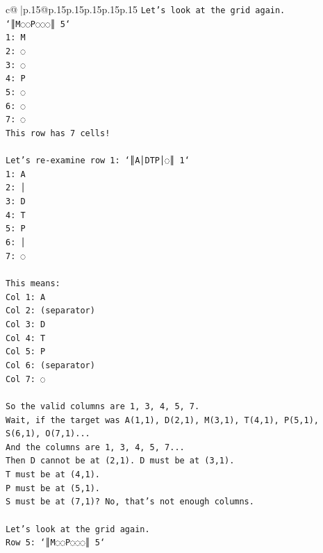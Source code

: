 \documentclass{article}
\begin{document}
{\begin{supertabular}{c@{$\;$}|p{.15\linewidth}@{}p{.15\linewidth}p{.15\linewidth}p{.15\linewidth}p{.15\linewidth}p{.15\linewidth}}
{{{\texttt{Let's look at the grid again.} \\
\texttt{`║M◌◌P◌◌◌║ 5`} \\
\texttt{1: M} \\
\texttt{2: ◌} \\
\texttt{3: ◌} \\
\texttt{4: P} \\
\texttt{5: ◌} \\
\texttt{6: ◌} \\
\texttt{7: ◌} \\
\texttt{This row has 7 cells!} \\
\\ 
\texttt{Let's re{-}examine row 1: `║A│DTP│◌║ 1`} \\
\texttt{1: A} \\
\texttt{2: │} \\
\texttt{3: D} \\
\texttt{4: T} \\
\texttt{5: P} \\
\texttt{6: │} \\
\texttt{7: ◌} \\
\\ 
\texttt{This means:} \\
\texttt{Col 1: A} \\
\texttt{Col 2: (separator)} \\
\texttt{Col 3: D} \\
\texttt{Col 4: T} \\
\texttt{Col 5: P} \\
\texttt{Col 6: (separator)} \\
\texttt{Col 7: ◌} \\
\\ 
\texttt{So the valid columns are 1, 3, 4, 5, 7.} \\
\texttt{Wait, if the target was A(1,1), D(2,1), M(3,1), T(4,1), P(5,1), S(6,1), O(7,1)...} \\
\texttt{And the columns are 1, 3, 4, 5, 7...} \\
\texttt{Then D cannot be at (2,1). D must be at (3,1).} \\
\texttt{T must be at (4,1).} \\
\texttt{P must be at (5,1).} \\
\texttt{S must be at (7,1)? No, that's not enough columns.} \\
\\ 
\texttt{Let's look at the grid again.} \\
\texttt{Row 5: `║M◌◌P◌◌◌║ 5`} \\
}}}
\end{supertabular}}
\end{document}
